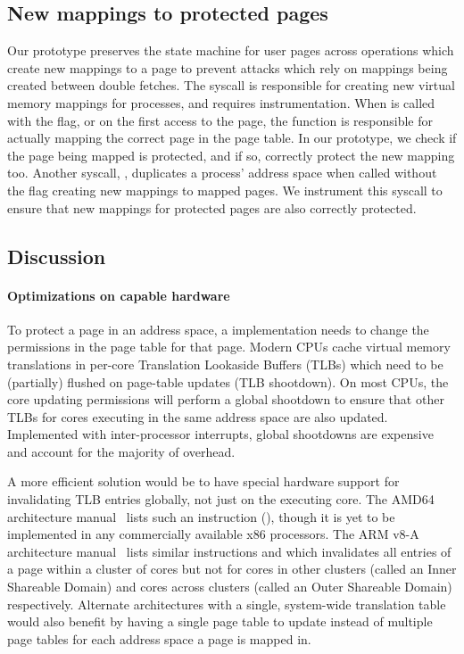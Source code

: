 \documentclass[letterpaper,twocolumn,10pt, anonymous]{article}
\begin{document}
\subsection{New mappings to protected pages}

Our \tiktok prototype preserves the state machine for user pages
across operations which create new mappings to a page to prevent 
attacks which rely on mappings being created between double fetches.
The  syscall is responsible for creating new virtual
memory mappings for processes, and requires instrumentation.
When  is called with the  flag, or 
on the first access to the page, the  function 
is responsible for actually mapping the correct page in the 
page table. 
In our prototype, we check if the page being mapped is protected, 
and if so, correctly protect the new mapping too.
Another syscall, , duplicates a process' address space
when called without the  flag creating new mappings
to mapped pages. 
We instrument this syscall to ensure that new mappings for protected 
pages are also correctly protected.


\subsection{Discussion}

\paragraph{Optimizations on capable hardware}
To protect a page in an address space, a \tiktok implementation 
needs to change the permissions in the page table for that page.
Modern CPUs cache virtual memory translations in per-core 
Translation Lookaside Buffers (TLBs) which need to be (partially) 
flushed on page-table updates (TLB shootdown).
On most CPUs, the core updating permissions will perform a global 
shootdown to ensure that other TLBs for cores executing in the 
same address space are also updated.
Implemented with inter-processor interrupts, global shootdowns 
are expensive and account for the majority of \tiktok overhead.

A more efficient solution would be to have special hardware support
for invalidating TLB entries globally, not just on the executing 
core. 
The AMD64 architecture manual~\cite{amd64prog} lists such an instruction 
(), though it is yet to be implemented in any commercially 
available x86 processors.
The ARM v8-A architecture manual~\cite{armv8a} lists similar instructions 
 and  which invalidates all entries 
of a page within a cluster of cores but not for cores in other clusters
(called an Inner Shareable Domain) and cores across clusters (called an 
Outer Shareable Domain) respectively.
Alternate architectures with a single, system-wide translation 
table~\cite{guptarebooting,ChaseLFL94} 
would also benefit \tiktok by having a single page table to 
update instead of multiple page tables for each address space a page
is mapped in.
\end{document}

